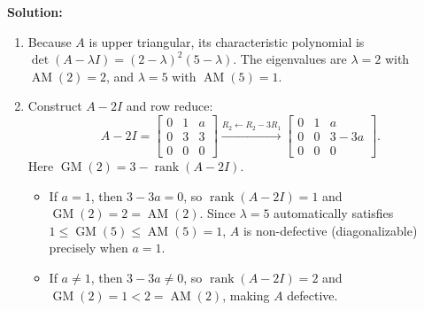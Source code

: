 \documentclass[11pt, letterpaper]{article}
\theoremstyle{definition}
\theoremstyle{remark}
\begin{document}
\textbf{Solution:}
\begin{enumerate}[label=(\alph*)]
    \item Because $A$ is upper triangular, its characteristic polynomial is $\det(A - \lambda I) = (2 - \lambda)^2(5 - \lambda)$. The eigenvalues are $\lambda = 2$ with $\operatorname{AM}(2) = 2$, and $\lambda = 5$ with $\operatorname{AM}(5) = 1$.

    \item Construct $A - 2I$ and row reduce:
    \[
    A - 2I = \begin{bmatrix} 0 & 1 & a \\ 0 & 3 & 3 \\ 0 & 0 & 0 \end{bmatrix}
    \xrightarrow{R_2 \leftarrow R_2 - 3R_1}
    \begin{bmatrix} 0 & 1 & a \\ 0 & 0 & 3 - 3a \\ 0 & 0 & 0 \end{bmatrix}.
    \]
    Here $\operatorname{GM}(2) = 3 - \operatorname{rank}(A - 2I)$.
    \begin{itemize}
        \item If $a = 1$, then $3 - 3a = 0$, so $\operatorname{rank}(A - 2I) = 1$ and $\operatorname{GM}(2) = 2 = \operatorname{AM}(2)$. Since $\lambda = 5$ automatically satisfies $1 \le \operatorname{GM}(5) \le \operatorname{AM}(5) = 1$, $A$ is non-defective (diagonalizable) precisely when $a = 1$.
        \item If $a \neq 1$, then $3 - 3a \neq 0$, so $\operatorname{rank}(A - 2I) = 2$ and $\operatorname{GM}(2) = 1 < 2 = \operatorname{AM}(2)$, making $A$ defective.
    \end{itemize}


\end{enumerate}
\end{document}
